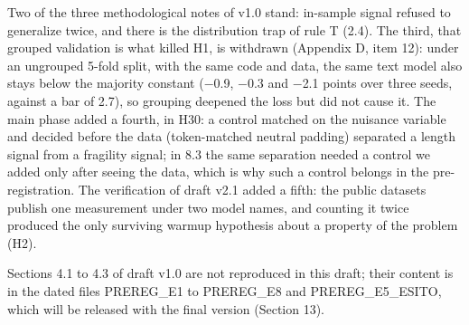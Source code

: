 Two of the three methodological notes of v1.0 stand: in-sample signal refused to generalize twice, and there is the distribution trap of rule T (2.4). The third, that grouped validation is what killed H1, is withdrawn (Appendix D, item 12): under an ungrouped 5-fold split, with the same code and data, the same text model also stays below the majority constant ($-$0.9, $-$0.3 and $-$2.1 points over three seeds, against a bar of 2.7), so grouping deepened the loss but did not cause it. The main phase added a fourth, in H30: a control matched on the nuisance variable and decided before the data (token-matched neutral padding) separated a length signal from a fragility signal; in 8.3 the same separation needed a control we added only after seeing the data, which is why such a control belongs in the pre-registration. The verification of draft v2.1 added a fifth: the public datasets publish one measurement under two model names, and counting it twice produced the only surviving warmup hypothesis about a property of the problem (H2).

Sections 4.1 to 4.3 of draft v1.0 are not reproduced in this draft; their content is in the dated files PREREG\_E1 to PREREG\_E8 and PREREG\_E5\_ESITO, which will be released with the final version (Section 13).
